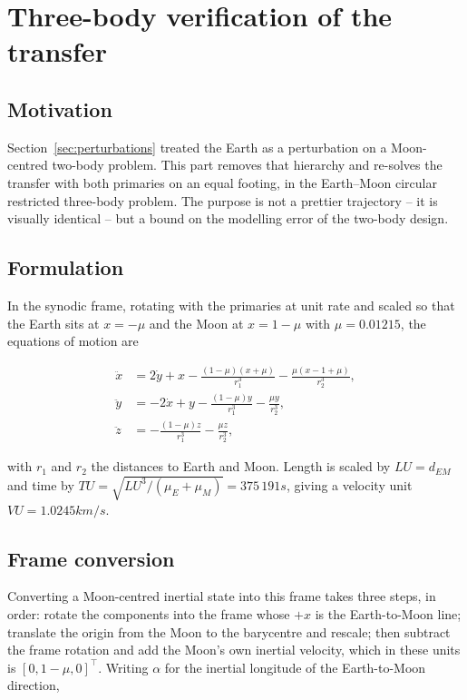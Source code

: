 \section{Three-body verification of the transfer}
\label{sec:cr3bp}

\subsection{Motivation}

Section~\ref{sec:perturbations} treated the Earth as a perturbation on a
Moon-centred two-body problem. This part removes that hierarchy and re-solves
the transfer with both primaries on an equal footing, in the Earth--Moon
circular restricted three-body problem. The purpose is not a prettier
trajectory -- it is visually identical -- but a bound on the modelling error of
the two-body design.

\subsection{Formulation}

In the synodic frame, rotating with the primaries at unit rate and scaled so
that the Earth sits at $x = -\mu$ and the Moon at $x = 1-\mu$ with
$\mu = 0.01215$, the equations of motion are \cite{szebehely}

\begin{align}
\ddot x &= 2\dot y + x - \frac{(1-\mu)(x+\mu)}{r_1^3} - \frac{\mu(x-1+\mu)}{r_2^3},\label{eq:cr3bpx}\\
\ddot y &= -2\dot x + y - \frac{(1-\mu)y}{r_1^3} - \frac{\mu y}{r_2^3},\label{eq:cr3bpy}\\
\ddot z &= -\frac{(1-\mu)z}{r_1^3} - \frac{\mu z}{r_2^3},\label{eq:cr3bpz}
\end{align}

with $r_1$ and $r_2$ the distances to Earth and Moon. Length is scaled by
$LU = d_{EM}$ and time by $TU = \sqrt{LU^3/(\mu_E+\mu_M)} = 375\,191\unit{s}$,
giving a velocity unit $VU = 1.0245\unit{km/s}$.

\subsection{Frame conversion}

Converting a Moon-centred inertial state into this frame takes three steps, in
order: rotate the components into the frame whose $+x$ is the Earth-to-Moon
line; translate the origin from the Moon to the barycentre and rescale; then
subtract the frame rotation and add the Moon's own inertial velocity, which in
these units is $[0, 1-\mu, 0]^\top$. Writing $\alpha$ for the inertial longitude
of the Earth-to-Moon direction,

